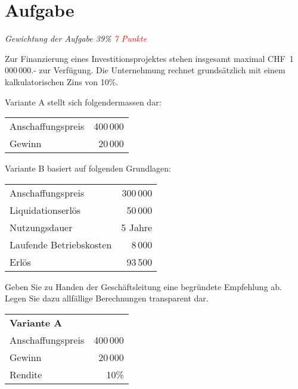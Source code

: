 \section{Aufgabe}
\textit{Gewichtung der Aufgabe 39\% \textcolor{red}{7 Punkte}}

Zur Finanzierung eines Investitionsprojektes stehen insgesamt maximal
CHF~1\,000\,000.- zur Verfügung. Die Unternehmung rechnet grundsätzlich
mit einem kalkulatorischen Zins von 10\%.

Variante A stellt sich folgendermassen dar:

\begin{tabular}[h]{lr}
  Anschaffungspreis&400\,000\\
  Gewinn& 20\,000\\
\end{tabular}

Variante B basiert auf folgenden Grundlagen:

\begin{tabular}[H]{lr}
  Anschaffungspreis&300\,000\\
  Liquidationserlös&50\,000\\
  Nutzungsdauer&5 Jahre\\
  Laufende Betriebskosten&8\,000\\
  Erlös&93\,500\\
\end{tabular}

Geben Sie zu Handen der Geschäftsleitung eine begründete Empfehlung ab.
Legen Sie dazu allfällige Berechnungen transparent dar.

\color{red}


\begin{tabular}[H]{lr}
  \multicolumn{2}{l}{\textbf{Variante A}}\\
  Anschaffungspreis&400\,000\\
  Gewinn& 20\,000\\
  Rendite&10\%\\
\end{tabular}

\vspace{3mm}

